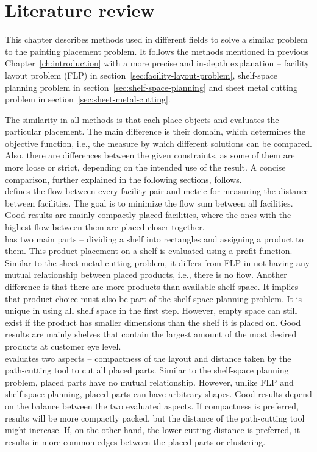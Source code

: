 \chapter{Literature review}\label{ch:literature-review}

This chapter describes methods used in different fields to solve a similar problem to the painting placement problem.
It follows the methods mentioned in previous Chapter~\ref{ch:introduction} with
a more precise and in-depth explanation – facility layout problem (FLP) in section~\ref{sec:facility-layout-problem},
shelf-space planning problem in section~\ref{sec:shelf-space-planning} and sheet metal cutting problem in section~\ref{sec:sheet-metal-cutting}.

The similarity in all methods is that each place objects and evaluates the particular placement.
The main difference is their domain, which determines the objective function, i.e., the measure by which different solutions can be compared.
Also, there are differences between the given constraints, as some of them are more loose or strict,
depending on the intended use of the result.
A concise comparison, further explained in the following sections, follows.\\

 defines the flow between every facility pair and metric for measuring the distance between facilities.
The goal is to minimize the flow sum between all facilities.
Good results are mainly compactly placed facilities, where the ones with the highest flow between them are placed closer together.\\

 has two main parts – dividing a shelf into rectangles and assigning a product to them.
This product placement on a shelf is evaluated using a profit function.
Similar to the sheet metal cutting problem, it differs from FLP
in not having any mutual relationship between placed products, i.e., there is no flow.
Another difference is that there are more products than available shelf space.
It implies that product choice must also be part of the shelf-space planning problem.
It is unique in using all shelf space in the first step.
However, empty space can still exist if the product has smaller dimensions than the shelf it is placed on.
Good results are mainly shelves that contain the largest amount of the most desired products at customer eye level.\\

 evaluates two aspects – compactness of the layout and distance taken by the path-cutting tool to cut all placed parts.
Similar to the shelf-space planning problem, placed parts have no mutual relationship.
However, unlike FLP and shelf-space planning, placed parts can have arbitrary shapes.
Good results depend on the balance between the two evaluated aspects.
If compactness is preferred, results will be more compactly packed, but the distance of the path-cutting tool might increase.
If, on the other hand, the lower cutting distance is preferred, it results in more common edges between the placed parts or clustering.\\






